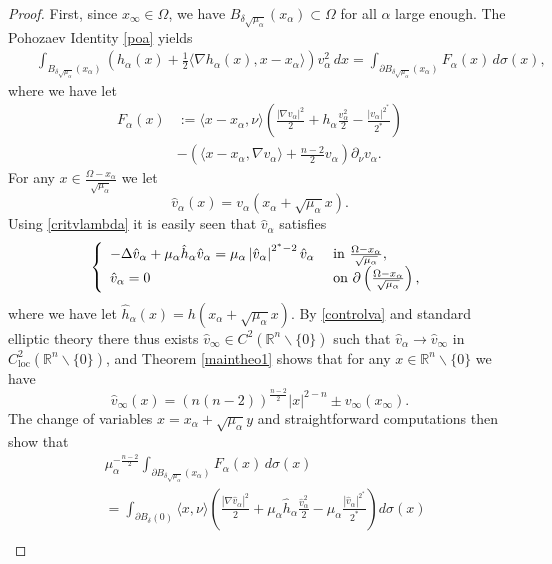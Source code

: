 \documentclass[10pt]{amsart}
\numberwithin{equation}{section}
\newcommand{\R}{\mathbb{R}}
\newcommand{\Om}{\Omega}
\newcommand{\ma}{\mu_\alpha}
\def \rr {\mathbb{R}}
\def \xl{x_\alpha}
\def \ma{\mu_{\alpha}}
\def \hva{\hat{v}_{\alpha}}
\def \va{v_{\alpha}}
\def \ha{h_{\alpha}}
\def \xin{x_{\infty}}
\def \r {\rangle}
\def \l{\langle}
\def \bsa{B_{\delta\sqrt{\ma}}}
\def \hha{\hat{h}_{\alpha}}
\def \sa {\sqrt{\ma}}
\DeclareMathOperator{\loc}{loc}
\theoremstyle{plain}
\theoremstyle{remark}
\begin{document}
\begin{proof}
First, since $x_\infty \in \Om$, we have $\bsa(\xl)\subset \Om$ for all $\alpha$ large enough. The Pohozaev Identity \eqref{poa} yields 
	\begin{eqnarray}\label{poa1}
		&&\int_{\bsa(\xl)}\left(\ha(x)+\frac12 \l\nabla \ha(x),x-\xl \r\right)  \va^2\, dx =\int_{\partial \bsa(\xl)}  F_{\alpha}(x) \,  d\sigma(x),
	\end{eqnarray}
	where we have let 
	\begin{equation}\label{balph}
	\begin{aligned}
	F_{\alpha}(x)& :=\l x-\xl, \nu\r\left(  \frac{|\nabla \va|^2}{2}+\ha \frac{\va^2}{2}-\frac{|\va|^{2^*}}{2^*}\right) \\
	& -\left( \l x-\xl, \nabla \va \r+\frac{n-2}{2}\va \right)\partial_{\nu}\va.
\end{aligned} 
	\end{equation} 
For any $x\in \frac{\Om-\xl}{\sqrt{\ma}}$ we let 
		\begin{equation*} 
			\hva(x)= \va (\xl+\sqrt{\ma} x). 
		\end{equation*}
Using \eqref{critvlambda} it is easily seen that $\hva$ satisfies 
		\begin{equation*} 
			\left\{\begin{array}{ll}
				-\Delta \hva +\ma\hha \hva=\ma\left|\hva\right|^{2^*-2}\hva &\hbox{ in } \frac{\Om-\xl}{\sqrt{\ma}}, \\
				\hva= 0  &\hbox{ on } \partial\left( \frac{\Om-\xl}{\sqrt{\ma}}\right),
			\end{array}\right.
		\end{equation*}
where we have let $\hha(x)=h(\xl+\sa x)$. By \eqref{controlva} and standard elliptic theory there thus exists $\hat{v}_{\infty}\in C^2(\rr^n\backslash\{0\})$ such that $ \hva \to \hat{v}_{\infty}$ in $C_{\loc}^2(\rr^n\backslash\{0\})$, and Theorem \ref{maintheo1} shows that for any $x \in \R^n \backslash \{0\}$ we have 
		\begin{equation*} 
			\hat{v}_{\infty}(x) = (n(n-2))^{\frac{n-2}{2}}|x|^{2-n} \pm v_{\infty}(\xin).
				\end{equation*}
The change of variables $x=\xl+\sa y$ and straightforward computations then show that 
	\begin{equation} \label{pohoint1}
	\begin{aligned}
		&\ma^{-\frac{n-2}{2}}\int_{\partial\bsa(\xl)} F_{\alpha}(x)\, d\sigma(x)\\
		&=\int_{\partial B_{\delta}(0)} \l x, \nu\r\left(  \frac{|\nabla \hva|^2}{2}+\ma\hha \frac{\hva^2}{2}-\ma\frac{|\hva|^{2^*}}{2^*}\right)d\sigma(x) \\

\end{aligned}
\end{equation}
\end{proof}
\end{document}
